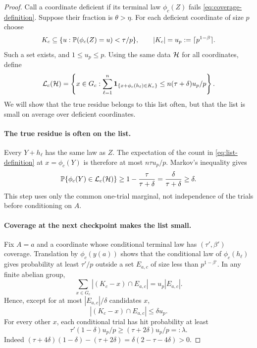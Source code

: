 \begin{proof}
Call a coordinate deficient if its terminal law $\phi_c(Z)$ fails
\eqref{eq:coverage-definition}. Suppose their fraction is
$\theta>\eta$. For each deficient coordinate of size $p$ choose
\[
 K_c\subseteq\{u:\mathbb P(\phi_c(Z)=u)<\tau/p\},
 \qquad |K_c|=u_p:=\lceil p^{1-\beta}\rceil.
\]
Such a set exists, and $1\le u_p\le p$.
Using the same data $\mathcal H$ for all coordinates, define
\begin{equation}\label{eq:list-definition}
 \mathcal L_c(\mathcal H)=\left\{x\in G_c:
 \sum_{\ell=1}^n\mathbf1_{\{x+\phi_c(h_\ell)\in K_c\}}
 \le n(\tau+\delta)u_p/p\right\}.
\end{equation}
We will show that the true residue belongs to this list often, but
that the list is small on average over deficient coordinates.

\paragraph{The true residue is often on the list.}
Every $Y+h_\ell$ has the same law as $Z$. The expectation of the count
in \eqref{eq:list-definition} at $x=\phi_c(Y)$ is therefore at most
$n\tau u_p/p$. Markov's inequality gives
\begin{equation}\label{eq:true-list}
 \mathbb P\{\phi_c(Y)\in\mathcal L_c(\mathcal H)\}
 \ge1-\frac{\tau}{\tau+\delta}
 =\frac\delta{\tau+\delta}\ge\delta.
\end{equation}
This step uses only the common one-trial marginal, not independence
of the trials before conditioning on $A$.

\paragraph{Coverage at the next checkpoint makes the list small.}
Fix $A=a$ and a coordinate whose conditional terminal law has
$(\tau',\beta')$ coverage. Translation by $\phi_c(y(a))$ shows that
the conditional law of $\phi_c(h_\ell)$ gives probability at least
$\tau'/p$ outside a set $E_{a,c}$ of size less than $p^{1-\beta'}$.
In any finite abelian group,
\[
 \sum_{x\in G_c}|(K_c-x)\cap E_{a,c}|=u_p|E_{a,c}|.
\]
Hence, except for at most $|E_{a,c}|/\delta$ candidates $x$,
\[
 |(K_c-x)\cap E_{a,c}|\le\delta u_p.
\]
For every other $x$, each conditional trial has hit probability at least
\[
 \tau'(1-\delta)u_p/p
 \ge(\tau+2\delta)u_p/p=:\lambda.
\]
Indeed $(\tau+4\delta)(1-\delta)-(\tau+2\delta)
=\delta(2-\tau-4\delta)>0$.


\end{proof}
